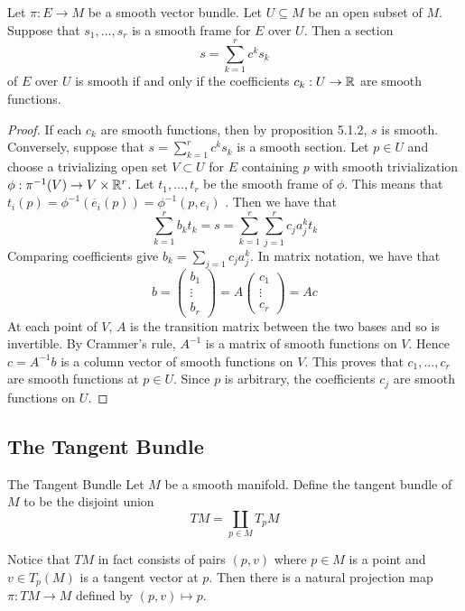 \documentclass[a4paper]{article}
\begin{document}
\begin{prp}{}{} Let $\pi:E\to M$ be a smooth vector bundle. Let $U\subseteq M$ be an open subset of $M$. Suppose that $s_1,\dots,s_r$ is a smooth frame for $E$ over $U$. Then a section $$s=\sum_{k=1}^rc^ks_k$$ of $E$ over $U$ is smooth if and only if the coefficients $c_k:U\to\mathbb{R}$ are smooth functions. \tcbline
\begin{proof}
If each $c_k$ are smooth functions, then by proposition 5.1.2, $s$ is smooth. Conversely, suppose that $s=\sum_{k=1}^rc^ks_k$ is a smooth section. Let $p\in U$ and choose a trivializing open set $V\subset U$ for $E$ containing $p$ with smooth trivialization $\phi:\pi^{-1}(V)\to V\times\mathbb{R}^r$. Let $t_1,\dots,t_r$ be the smooth frame of $\phi$. This means that $t_i(p)=\phi^{-1}(\overline{e}_i(p))=\phi^{-1}(p,e_i)$ . Then we have that $$\sum_{k=1}^rb_kt_k=s=\sum_{k=1}^r\sum_{j=1}^rc_ja_j^kt_k$$ Comparing coefficients give $b_k=\sum_{j=1}c_ja_j^k$. In matrix notation, we have that $$b=\begin{pmatrix}
b_1\\
\vdots\\
b_r
\end{pmatrix}=A\begin{pmatrix}
c_1\\
\vdots\\
c_r
\end{pmatrix}=Ac$$ At each point of $V$, $A$ is the transition matrix between the two bases and so is invertible. By Crammer's rule, $A^{-1}$ is a matrix of smooth functions on $V$. Hence $c=A^{-1}b$ is a column vector of smooth functions on $V$. This proves that $c_1,\dots,c_r$ are smooth functions at $p\in U$. Since $p$ is arbitrary, the coefficients $c_j$ are smooth functions on $U$. 
\end{proof}
\end{prp}

\subsection{The Tangent Bundle}
\begin{defn}{The Tangent Bundle}{} Let $M$ be a smooth manifold. Define the tangent bundle of $M$ to be the disjoint union $$TM=\coprod_{p\in M}T_pM$$
\end{defn}

Notice that $TM$ in fact consists of pairs $(p,v)$ where $p\in M$ is a point and $v\in T_p(M)$ is a tangent vector at $p$. Then there is a natural projection map $\pi:TM\to M$ defined by $(p,v)\mapsto p$. 
\end{document}
